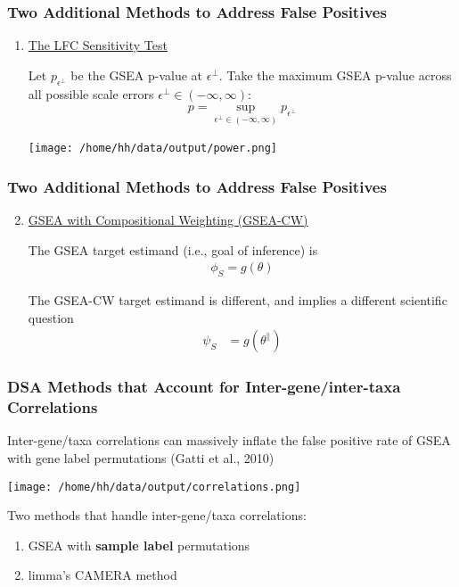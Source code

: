 \documentclass[11pt,t]{beamer}
\begin{document}
\begin{frame}
  \frametitle{Two Additional Methods to Address False Positives}
  \pause
  \begin{enumerate}
  \item \underline{The LFC Sensitivity Test}

    \vspace{5px}
    Let \(p_{\epsilon^\perp}\) be the GSEA p-value at \(\epsilon^\perp\). Take the maximum GSEA p-value across all possible scale errors \(\epsilon^\perp \in (-\infty, \infty)\):
    \begin{align*}
      p=\sup_{\epsilon^\perp \in (-\infty, \infty)} p_{\epsilon^\perp}
    \end{align*}

    \begin{center}
      \texttt{[image: /home/hh/data/output/power.png]}
    \end{center}


  \end{enumerate}  
\end{frame}

\begin{frame}
  \frametitle{Two Additional Methods to Address False Positives}
  \begin{enumerate}
   \setcounter{enumi}{1}
   \item \underline{GSEA with Compositional Weighting (GSEA-CW)}

    \vspace{5px}
    The GSEA target estimand (i.e., goal of inference) is
    \begin{align*}
      \phi_S = g(\theta)
    \end{align*}

    \pause

    The GSEA-CW target estimand is different, and implies a different scientific question
    \begin{align*}
      \psi_S &= g(\theta^\parallel)
    \end{align*}

    \pause
    
  \end{enumerate}
\end{frame}
  
\begin{frame}
  \frametitle{DSA Methods that Account for Inter-gene/inter-taxa Correlations}
  Inter-gene/taxa correlations can massively inflate the false positive rate of GSEA with gene label permutations (Gatti et al., 2010)

  \begin{center}
    \texttt{[image: /home/hh/data/output/correlations.png]}
  \end{center}
  
  Two methods that handle inter-gene/taxa correlations:
  \begin{enumerate}
    \item GSEA with \textbf{sample label} permutations
    \item limma's CAMERA method
  \end{enumerate}
  
\end{frame}
\end{document}
